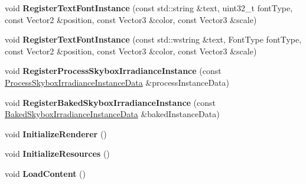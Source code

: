 \begin{DoxyCompactItemize}
\item 
\mbox{\label{classAppRenderer_a04df5c805c9c18d118183fb3b78f310d}} 
void {\bfseries Register\+Text\+Font\+Instance} (const std\+::string \&text, uint32\+\_\+t font\+Type, const Vector2 \&position, const Vector3 \&color, const Vector3 \&scale)
\item 
\mbox{\label{classAppRenderer_a28d18978de2d1a92d3dece7554259287}} 
void {\bfseries Register\+Text\+Font\+Instance} (const std\+::wstring \&text, Font\+Type font\+Type, const Vector2 \&position, const Vector3 \&color, const Vector3 \&scale)
\item 
\mbox{\label{classAppRenderer_a46cea9dbc355592e2b3d74b8ef297175}} 
void {\bfseries Register\+Process\+Skybox\+Irradiance\+Instance} (const \hyperlink{structProcessSkyboxIrradianceInstanceData}{Process\+Skybox\+Irradiance\+Instance\+Data} \&process\+Instance\+Data)
\item 
\mbox{\label{classAppRenderer_a596152f75036dfc597666d3ead6e0959}} 
void {\bfseries Register\+Baked\+Skybox\+Irradiance\+Instance} (const \hyperlink{structBakedSkyboxIrradianceInstanceData}{Baked\+Skybox\+Irradiance\+Instance\+Data} \&baked\+Instance\+Data)
\item 
\mbox{\label{classAppRenderer_abcb06ec3a4f44df9a6b93c9da882e150}} 
void {\bfseries Initialize\+Renderer} ()
\item 
\mbox{\label{classAppRenderer_a469d6a18301eabc3c4942a2a7d95a5fe}} 
void {\bfseries Initialize\+Resources} ()
\item 
\mbox{\label{classAppRenderer_a243e0f5390b30ead7661cda98fd606a6}} 
void {\bfseries Load\+Content} ()
\end{DoxyCompactItemize}
